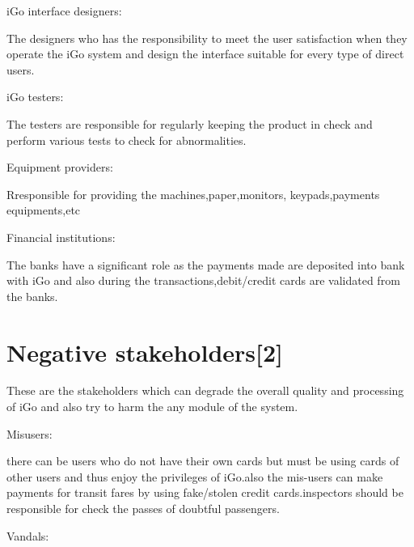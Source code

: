 \documentclass[12pt]{report}
\begin{document}
\vspace{\baselineskip}

iGo interface designers:\par

The designers who has the responsibility to meet the user satisfaction when they operate the iGo system and design the interface suitable for every type of direct users.\par

iGo testers:\par

The testers are responsible for regularly keeping the product in check and perform various tests to check for abnormalities.\par


\vspace{\baselineskip}
Equipment providers:\par
Rresponsible for providing the machines,paper,monitors, keypads,payments equipments,etc\par


\vspace{\baselineskip}
Financial institutions:\par

The banks have a significant role as the payments made are deposited into bank with iGo and also during the transactions,debit/credit cards are validated from the banks.\par


\vspace{\baselineskip}
\section{Negative stakeholders[2]}

These are the stakeholders which can degrade the overall quality and processing of iGo and also try to harm the any module of the system.\par


\vspace{\baselineskip}
Misusers:\par

there can be users who do not have their own cards but must be using cards of other users and thus enjoy the privileges of iGo.also the mis-users can make payments for transit fares by using fake/stolen credit cards.inspectors should be responsible for check the passes of doubtful passengers.\par


\vspace{\baselineskip}
Vandals:\par
\end{document}
